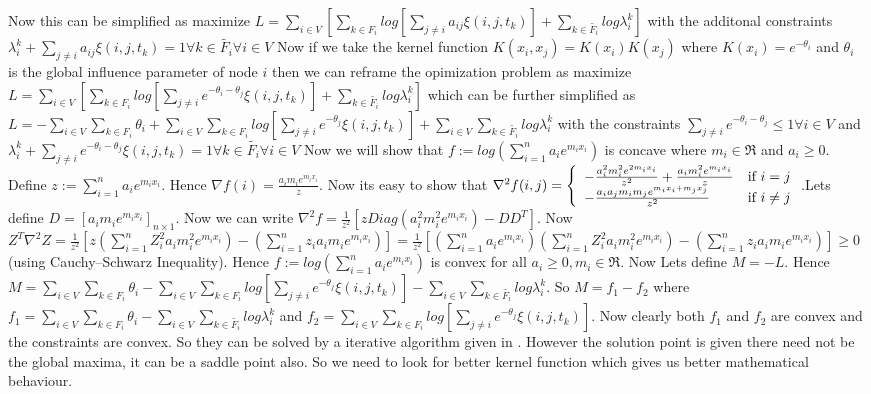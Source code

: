 Now this can be simplified as maximize $L = \displaystyle\sum_{i \in V}[\displaystyle\sum_{k \in F_i}log[\displaystyle\sum_{j \neq i} a_{ij}\xi (i,j,t_k)]+\displaystyle\sum_{k \in \widetilde{F_{i}}}log\lambda_{i}^{k}]$ with the additonal constraints $\lambda_{i}^{k} + \displaystyle\sum_{j \neq i}a_{ij}\xi (i,j,t_k) = 1 \forall k \in \widetilde{F_{i}} \forall i \in V$
Now if we take the kernel function $K(x_i,x_j) = K(x_i)K(x_j)$ where $K(x_i) = e^{-\theta_i}$ and $\theta_i$ is the global influence parameter of node $i$ then we can reframe the opimization problem as maximize $L = \displaystyle\sum_{i \in V}[\displaystyle\sum_{k \in F_i}log[\displaystyle\sum_{j \neq i} e^{-\theta_i-\theta_j}\xi (i,j,t_k)]+\displaystyle\sum_{k \in \widetilde{F_{i}}}log\lambda_{i}^{k}]$ which can be further simplified as $L = -\displaystyle\sum_{i \in V}\displaystyle\sum_{k \in F_i}\theta_i+\displaystyle\sum_{i \in V}\displaystyle\sum_{k \in F_i}log[\displaystyle\sum_{j \neq i} e^{-\theta_j}\xi (i,j,t_k)]+\displaystyle\sum_{i \in V}\displaystyle\sum_{k \in \widetilde{F_{i}}}log\lambda_{i}^{k}$ with the constraints $\displaystyle\sum_{j \neq i}e^{-\theta_i-\theta_j} \leq 1 \forall i \in V$ and $\lambda_{i}^{k} + \displaystyle\sum_{j \neq i}e^{-\theta_i-\theta_j}\xi(i,j,t_k) = 1 \forall k \in \widetilde{F_i} \forall i\in V$
Now we will show that $f := log(\displaystyle\sum_{i=1}^{n}a_ie^{m_ix_i})$ is concave where $m_i \in \Re$ and $a_i \geq 0$. Define $z := \displaystyle\sum_{i=1}^{n}a_ie^{m_ix_i}$. Hence $\nabla f (i) = \frac{a_im_ie^{m_ix_i}}{z}$. Now its easy to show that $\nabla^2 f(i,j) = \left\{ \begin{array}{ll} -\frac{a_{i}^{2}m_{i}^2e^{2m_ix_i}}{z^2} + \frac{a_im_i^2e^{m_ix_i}}{z} & \mbox{if } i = j \\ -\frac{a_ia_jm_im_je^{m_ix_i+m_jx_j}}{z^2} & \mbox{if } i \neq j \end{array} \right.$.Lets define $D = [a_im_ie^{m_ix_i}]_{n \times 1}$. Now we can write $\nabla^2 f = \frac{1}{z^2}[zDiag(a_i^2m_i^2e^{m_ix_i})-DD^T]$. Now $Z^T \nabla^2 Z = \frac{1}{z^2}[z(\displaystyle\sum_{i=1}^{n} Z_i^2a_im_i^2e^{m_ix_i})-(\displaystyle\sum_{i=1}^{n}z_ia_im_ie^{m_ix_i})] = \frac{1}{z^2}[(\displaystyle\sum_{i=1}^{n}a_ie^{m_ix_i})(\displaystyle\sum_{i=1}^{n} Z_i^2a_im_i^2e^{m_ix_i}) - (\displaystyle\sum_{i=1}^{n}z _ia_im_ie^{m_ix_i})] \geq 0$ (using Cauchy–Schwarz Inequality). Hence $f := log(\displaystyle\sum_{i=1}^{n}a_ie^{m_ix_i})$ is convex for all $a_i \geq 0,m_i \in \Re$. Now Lets define $M = -L$. Hence $M = \displaystyle\sum_{i \in V}\displaystyle\sum_{k \in F_i}\theta_i-\displaystyle\sum_{i \in V}\displaystyle\sum_{k \in F_i}log[\displaystyle\sum_{j \neq i} e^{-\theta_j}\xi (i,j,t_k)]-\displaystyle\sum_{i \in V}\displaystyle\sum_{k \in \widetilde{F_{i}}}log\lambda_{i}^{k}$. So $M = f_1 - f_2$ where $f_1 = \displaystyle\sum_{i \in V}\displaystyle\sum_{k \in F_i}\theta_i-\displaystyle\sum_{i \in V}\displaystyle\sum_{k \in \widetilde{F_{i}}}log\lambda_{i}^{k}$ and $f_2 = \displaystyle\sum_{i \in V}\displaystyle\sum_{k \in F_i}log[\displaystyle\sum_{j \neq i} e^{-\theta_j}\xi (i,j,t_k)]$. Now clearly both $f_1$ and $f_2$ are convex and the constraints are convex. So they can be solved by a iterative algorithm given in \cite{cccp}. However the solution point is given there need not be the global maxima, it can be a saddle point also. So we need to look for better kernel function which gives us better mathematical behaviour.
